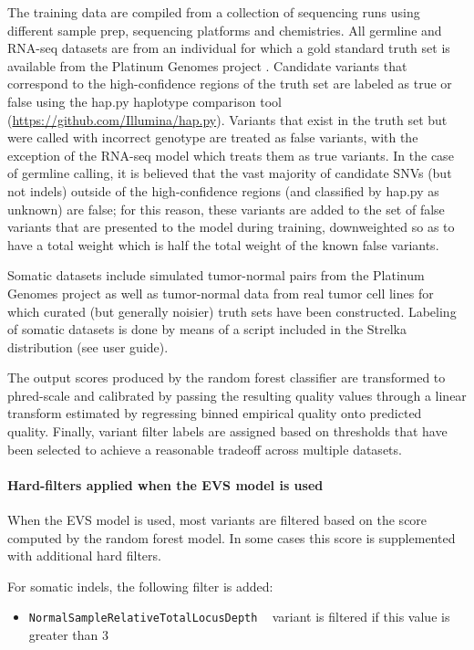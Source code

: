 \documentclass{article}
\begin{document}
The training data are compiled from a collection of sequencing runs using different sample prep, sequencing platforms and chemistries. All germline and RNA-seq datasets are from an individual for which a gold standard truth set is available from the Platinum Genomes project \cite{eberle2017}. Candidate variants that correspond to the high-confidence regions of the truth set are labeled as true or false using the hap.py haplotype comparison tool (\url{https://github.com/Illumina/hap.py}). Variants that exist in the truth set but were called with incorrect genotype are treated as false variants, with the exception of the RNA-seq model which treats them as true variants. In the case of germline calling, it is believed that the vast majority of candidate SNVs (but not indels) outside of the high-confidence regions (and classified by hap.py as unknown) are false; for this reason, these variants are added to the set of false variants that are presented to the model during training, downweighted so as to have a total weight which is half the total weight of the known false variants.

Somatic datasets include simulated tumor-normal pairs from the Platinum Genomes project as well as tumor-normal data from real tumor cell lines for which curated (but generally noisier) truth sets have been constructed. Labeling of somatic datasets is done by means of a script included in the Strelka distribution (see user guide).

The output scores produced by the random forest classifier are transformed to phred-scale and calibrated by passing the resulting quality values through a linear transform estimated by regressing binned empirical quality onto predicted quality. Finally, variant filter labels are assigned based on thresholds that have been selected to achieve a reasonable tradeoff across multiple datasets.

\paragraph{Hard-filters applied when the EVS model is used}

When the EVS model is used, most variants are filtered based on the score computed by the random forest model. In some cases this score is supplemented with additional hard filters.

For somatic indels, the following filter is added:

\begin{itemize}
    \item \texttt{NormalSampleRelativeTotalLocusDepth} ~ variant is filtered if this value is greater than 3
\end{itemize}
\end{document}

